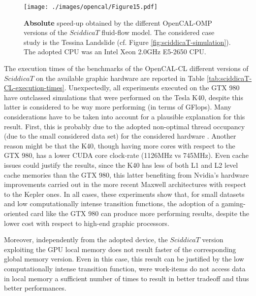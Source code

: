 \begin{figure}
	\begin{center}
		\texttt{[image: ./images/opencal/Figure15.pdf]}
		\caption[\textbf{Absolute} speed-up obtained by the different OpenCAL-OMP versions of
		the $SciddicaT$ fluid-flow model.]{\textbf{Absolute} speed-up obtained by the different OpenCAL-OMP versions of
			the $SciddicaT$ fluid-flow model. The considered case study is the
			Tessina Landslide (cf. Figure \ref{fig:sciddicaT-simulation}). The
			adopted CPU was an Intel Xeon 2.0GHz E5-2650 CPU.}
		\label{gr:sciddicaT-OMP-absolute-speed-up}
	\end{center}
\end{figure}

The execution times of the benchmarks of the OpenCAL-CL different
versions of $SciddicaT$ on the available graphic hardware are
reported in Table
\ref{tab:sciddicaT-CL-execution-times}. Unexpectedly, all
experiments executed on the GTX 980 have outclassed simulations
that were performed on the Tesla K40, despite this latter is
considered to be way more performing (in terms of GFlops). Many
considerations have to be taken into account for a plausible
explanation for this result. First, this is probably due to the
adopted non-optimal thread occupancy (due to the small considered
data set) for the considered hardware \cite{Kirk-2010}. Another
reason might be that the K40, though having more cores with
respect to the GTX 980, has a lower CUDA core clock-rate (1126MHz
vs 745MHz). Even cache issues could justify the results, since the
K40 has less of both L1 and L2 level cache memories than the GTX
980, this latter benefiting from Nvidia's hardware improvements
carried out in the more recent Maxwell architectures with respect
to the Kepler ones. In all cases, these experiments show that, for
small datasets and low computationally intense transition
functions, the adoption of a gaming-oriented card like the GTX 980
can produce more performing results, despite the lower cost with
respect to high-end graphic processors.

Moreover, independently from the adopted device, the $SciddicaT$
version exploiting the GPU local memory does not result faster of
the corresponding global memory version. Even in this case, this
result can be justified by the low computationally intense
transition function, were work-items do not access data in local
memory a sufficient number of times to result in better tradeoff
and thus better performances.

